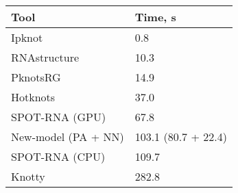 \begin{table}[h]
\centering
\begin{tabular}{|p{5.5cm}||p{4.5cm}|}
\hline
\textbf{Tool} & \textbf{Time, s} \\ \hline\hline
Ipknot & 0.8 \\ \hline
RNAstructure & 10.3 \\ \hline
PknotsRG & 14.9 \\ \hline
Hotknots & 37.0 \\ \hline
SPOT-RNA (GPU) & 67.8 \\ \hline
New-model (PA + NN) & 103.1 (80.7 + 22.4) \\ \hline
SPOT-RNA (CPU) & 109.7 \\ \hline
Knotty & 282.8 \\ \hline
\end{tabular}
\end{table}